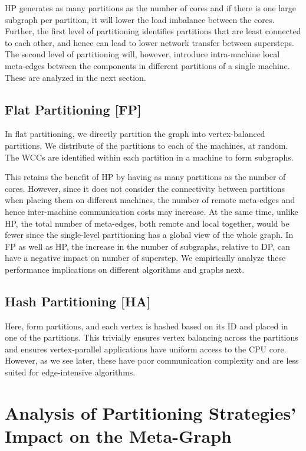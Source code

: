 \documentclass[10pt,conference, compsocconf]{IEEEtran}
\begin{document}
HP generates as many partitions as the number of cores and if there is one large subgraph per partition, it will lower the load imbalance between the cores. Further, the first level of partitioning identifies  partitions that are least connected to each other, and hence can lead to lower network transfer between supersteps. The second level of partitioning will, however, introduce intra-machine local meta-edges between the components in different partitions of a single machine.  These are analyzed in the next section. 

\subsection{Flat Partitioning [FP]} In flat partitioning, we directly partition the graph  into  vertex-balanced partitions. We distribute  of the partitions to each of the  machines, at random. The WCCs are identified within each partition in a machine to form subgraphs. 

This retains the benefit of HP by having as many partitions as the number of cores. However, since it does not consider the connectivity between partitions when placing them on different machines, the number of remote meta-edges and hence inter-machine communication costs may increase. At the same time, unlike HP, the total number of meta-edges, both remote and local together, would be fewer since the single-level partitioning has a global view of the whole graph. In FP as well as HP, the increase in the number of subgraphs, relative to DP, can have a negative impact on number of superstep. We empirically analyze these performance implications on different algorithms and graphs next.

\subsection{Hash Partitioning [HA]}
Here, form  partitions, and each vertex is hashed based on its ID and placed in one of the  partitions. This trivially ensures vertex balancing across the partitions and ensures vertex-parallel applications have uniform access to the CPU core. However, as we see later, these have poor communication complexity and are less suited for edge-intensive algorithms.



\section{Analysis of Partitioning Strategies' Impact on the Meta-Graph}\label{sec:metagraph}
\end{document}
